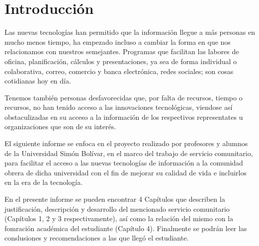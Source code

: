 	\chapter*{Introducción}
    
    Las nuevas tecnologías han permitido que la información llegue a más personas en mucho menos tiempo, ha empezado incluso a cambiar la forma en que nos relacionamos con nuestros semejantes. Programas que facilitan las labores de oficina, planificación, cálculos y presentaciones, ya sea de forma individual o colaborativa, correo, comercio y banca electrónica, redes sociales; son cosas cotidianas hoy en día.
    
    Tenemos también personas desfavorecidas que, por falta de recursos, tiempo o recursos, no han tenido acceso a las innovaciones tecnológicas, viendose así obstaculizadas en su acceso a la información de los respectivos representates u organizaciones que son de su interés.
    
    El siguiente informe se enfoca en el proyecto realizado por profesores y alumnos de la Universidad Simón Bolívar, en el marco del trabajo de servicio comunitario, para facilitar el acceso a las nuevas tecnologías de información a la comunidad obrera de dicha universidad con el fin de mejorar su calidad de vida e incluirlos en la era de la tecnología.
    
    En el presente informe se pueden encontrar 4 Capítulos que describen la justificación, descripción y desarrollo del mencionado servicio comunitario (Capítulos 1, 2 y 3 respectivamente), así como la relación del mismo con la fomración académica del estudiante (Capítulo 4). Finalmente se podrán leer las conslusiones y recomendaciones a las que llegó el estudiante.
	\pagebreak